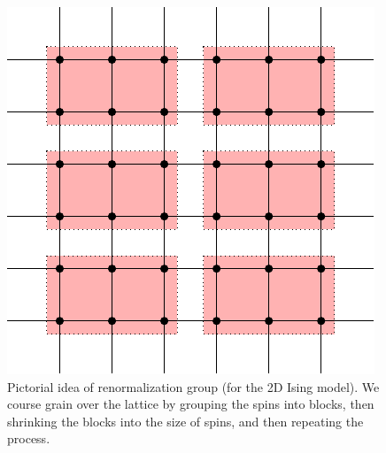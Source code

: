 \begin{figure}[htbp]
    \centering
    \includegraphics{Images/fig-Isingblocks.pdf}
    \caption{Pictorial idea of renormalization group (for the 2D Ising model). We course grain over the lattice by grouping the spins into blocks, then shrinking the blocks into the size of spins, and then repeating the process.}
    \label{fig-Isingblocks}
\end{figure}
